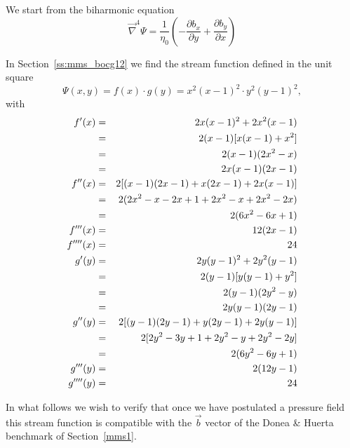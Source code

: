 We start from the biharmonic equation 
\[
\vec\nabla^4 \Psi = \frac{1}{\eta_0} \left( -\frac{\partial b_x}{\partial y}
+\frac{\partial b_y}{\partial x} \right)
\]

In Section~\ref{ss:mms_bocg12} we find the stream function 
defined in the unit square
\[
\Psi (x,y)=f(x) \cdot g(y)=x^2(x-1)^2 \cdot y^2(y-1)^2, 
\]
with 
\begin{eqnarray}
f'(x)
&=&2x(x-1)^2+2x^2(x-1) \nonumber\\
&=&2(x-1)[x(x-1)+x^2]  \nonumber\\
&=&2(x-1)(2x^2 -x)  \nonumber\\
&=&2x(x-1)(2x -1)  \nonumber\\
f''(x)
&=& 2 [ (x-1)(2x -1) + x(2x-1)+2x(x-1)] \nonumber\\
&=& 2 (2x^2 -x-2x+1 + 2x^2-x+2x^2-2x) \nonumber\\
&=& 2 (6x^2 -6x +1) \nonumber\\
f'''(x) &=& 12(2x-1) \nonumber\\
f''''(x) &=& 24 \nonumber\\
g'(y)
&=& 2y (y-1)^2 + 2y^2(y-1)  \nonumber\\
&=& 2(y-1)[y(y-1)+y^2] \nonumber\\
&=& 2(y-1)(2y^2-y) \nonumber\\
&=& 2y(y-1)(2y-1) \nonumber\\
g''(y) 
&=& 2[ (y-1)(2y-1) +y(2y-1)+2y(y-1) ] \nonumber\\
&=& 2[ 2y^2 - 3y +1 +2y^2-y +2y^2-2y] \nonumber\\
&=& 2(6y^2 -6y+1) \nonumber\\
g'''(y) &=& 2(12y-1) \nonumber\\
g''''(y) &=& 24 \nonumber
\end{eqnarray}

In what follows we wish to verify that once we have postulated 
a pressure field this stream function is compatible with the 
$\vec{b}$ vector of the Donea \& Huerta benchmark of Section~\ref{mms1}.

